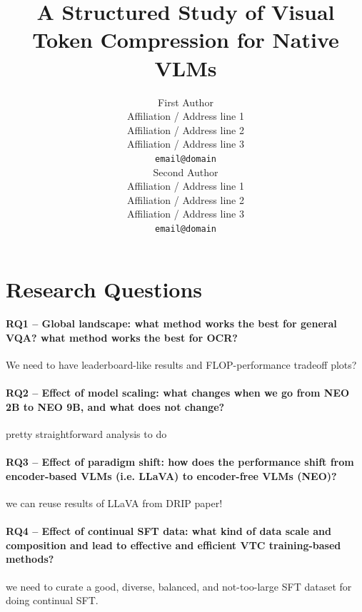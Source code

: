 \documentclass[11pt]{article}
\title{A Structured Study of Visual Token Compression for Native VLMs}
\author{First Author \\
  Affiliation / Address line 1 \\
  Affiliation / Address line 2 \\
  Affiliation / Address line 3 \\
  \texttt{email@domain} \\\And
  Second Author \\
  Affiliation / Address line 1 \\
  Affiliation / Address line 2 \\
  Affiliation / Address line 3 \\
  \texttt{email@domain} \\}
\begin{document}
\maketitle
\begin{abstract}
\end{abstract}

\section{Research Questions}

\paragraph{RQ1 -- Global landscape: what method works the best for general VQA? what method works the best for OCR?} We need to have leaderboard-like results and FLOP-performance tradeoff plots?

\paragraph{RQ2 -- Effect of model scaling: what changes when we go from NEO 2B to NEO 9B, and what does not change?} pretty straightforward analysis to do

\paragraph{RQ3 -- Effect of paradigm shift: how does the performance shift from encoder-based VLMs (i.e. LLaVA) to encoder-free VLMs (NEO)?} we can reuse results of LLaVA from DRIP paper!

\paragraph{RQ4 -- Effect of continual SFT data: what kind of data scale and composition and lead to effective and efficient VTC training-based methods?} we need to curate a good, diverse, balanced, and not-too-large SFT dataset for doing continual SFT.
\end{document}
